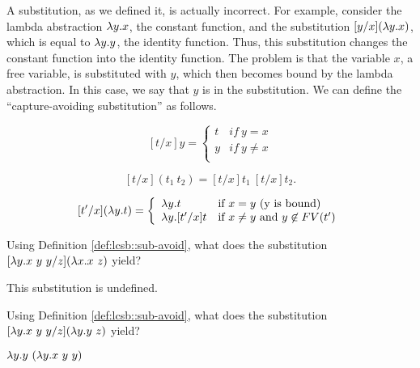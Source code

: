 \begin{gram}[Capture]
\label{grm:lcsb::capture}
A substitution, as we defined it, is actually incorrect.  
%
For example, consider the lambda abstraction $\lambda y.x$, the constant
function, and the substitution $[y/x](\lambda y.x)$, which is equal to $\lambda
y.y$, the identity function.
%
Thus, this substitution changes the constant function into the
identity function.
%
The problem is that the variable $x$, a free
variable, is substituted with $y$, which then becomes bound by the
lambda abstraction.  In this case, we say that $y$ is 
in the substitution.
%
We can define the ``capture-avoiding substitution'' as follows. 
\end{gram}


\begin{definition}
\label{def:lcsb::sub-avoid}
\[
[t/x]y = \left\{ \begin{array}{ll}
        t & if~y = x \\
        y & if~y\neq x \\
        \end{array} \right.
\]


\[
[t/x](t_1~t_2) = [t/x]t_1~[t/x]t_2.
 \]

\[
[t'/x](\lambda y.t) = 
\left\{ \begin{array}{ll}

\lambda y.t &\mbox{if}~ x = y \mbox{ (y is bound)} \\

\lambda y.[t'/x]t &\mbox{if}~ x \neq y \mbox { and } y \not \in FV(t') \\

\end{array} \right. 
\]
\end{definition}

\begin{flex}
\begin{exercise}
\label{xrcs:lcsb::sub-undef}
Using Definition \ref{def:lcsb::sub-avoid},
%
what does the substitution $[\lambda y.x~y~y/z](\lambda x.x~z)$ yield?
\end{exercise}
\begin{solution}
\label{sol:lcsb::sub-basic}
This substitution is undefined.
\end{solution}
\end{flex}

\begin{flex}
\begin{exercise}
\label{xrcs:lcsb::sub-rename}
Using Definition \ref{def:lcsb::sub-avoid},
what does the substitution  $[\lambda y.x~y~y/z](\lambda y.y~z)$ yield?
\end{exercise}
\begin{solution}
$\lambda y.y~(\lambda y.x~y~y)$
\end{solution}
\end{flex}


